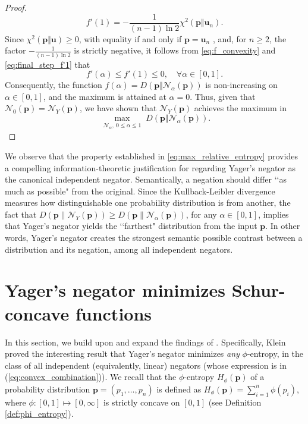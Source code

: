 \documentclass[pdflatex,sn-basic,iicol]{sn-jnl}%
\theoremstyle{thmstyleone}%
\theoremstyle{thmstyletwo}%
\theoremstyle{thmstylethree}%
\newcommand{\N}{\mathcal{N}}
\newcommand{\bp}{\mathbf{p}}
\newcommand{\bu}{\mathbf{u}}
\begin{document}
\begin{proof}
{    \begin{equation}
        f'(1)=-\frac{1}{(n-1)\ln 2}\chi^2(\bp\Vert\bu_n).\label{eq:final_step_f'1}
    \end{equation}
    Since $\chi^2(\bp\Vert\bu)\geq 0$, with equality if and only if $\bp=\bu_n$ \citep{sason2016f}, and, for $n\geq 2$, the factor $-\frac{1}{(n-1)\ln 2}$ is strictly negative, it follows from \eqref{eq:f_convexity} and \eqref{eq:final_step_f'1} that
    \begin{equation*}
        f'(\alpha)\leq f'(1)\leq 0, \quad\forall\alpha\in[0,1].
    \end{equation*}
    Consequently, the function $f(\alpha)=D(\bp\Vert\N_\alpha(\bp))$ is non-increasing on $\alpha\in[0,1]$, and the maximum is attained at $\alpha=0$. Thus, given that $\N_0(\bp)=\N_Y(\bp)$, we have shown that $\N_Y(\bp)$ achieves the maximum in
    \begin{equation*}
    \max_{\substack{\N_\alpha, \ 0\leq \alpha\leq 1}} D(\bp\Vert \N_\alpha(\bp)).
    \end{equation*}
    }
\end{proof}

We observe that the property established in \eqref{eq:max_relative_entropy} provides a compelling information-theoretic justification for regarding Yager's negator as the canonical independent negator.
Semantically, a negation should differ \lq\lq as much as possible" from the original. Since the Kullback-Leibler divergence measures how distinguishable one probability distribution is from another, the fact 
that $D(\bp\|\N_Y(\bp))\geq D(\bp\|\N_\alpha(\bp))$, for any $\alpha\in[0,1]$, implies that Yager's negator yields the \lq\lq farthest"
distribution from the input $\bp$. In other words,
Yager's negator creates the strongest semantic possible contrast between a distribution and its negation,
 among all independent negators.

\section{Yager's negator minimizes Schur-concave functions}\label{sec:min_entropy}

In this section, we build upon and expand the findings of \cite{klein2022some}. Specifically,  Klein proved the interesting result
that Yager's negator minimizes \textit{any}  $\phi$-entropy, in the class of all independent (equivalently,
linear)
negators (whose expression is in (\ref{eq:convex_combination})).
We recall that the $\phi$-entropy $H_\phi(\bp)$ of a probability distribution
$\bp=(p_1, \ldots , p_n)$ is defined as $H_\phi(\bp)=\sum_{i=1}^n\phi(p_i)$, where
$\phi:[0,1]\mapsto [0, \infty]$
is strictly concave on $[0, 1]$ (see Definition \ref{def:phi_entropy}).
\end{document}
